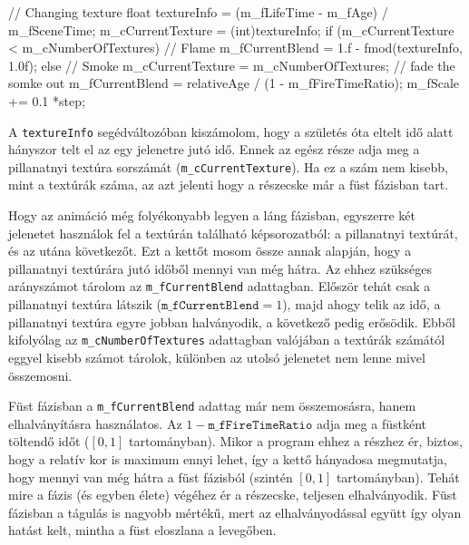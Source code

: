 \begin{cpp}
// Changing texture
float textureInfo = (m_fLifeTime - m_fAge) / m_fSceneTime;
m_cCurrentTexture = (int)textureInfo;
if (m_cCurrentTexture < m_cNumberOfTextures)
{
	// Flame
	m_fCurrentBlend = 1.f - fmod(textureInfo, 1.0f);
}
else
{
	// Smoke
	m_cCurrentTexture = m_cNumberOfTextures;
	// fade the somke out
	m_fCurrentBlend = relativeAge / (1 - m_fFireTimeRatio);
	m_fScale += 0.1 *step;
}
\end{cpp}

A \texttt{textureInfo} segédváltozóban kiszámolom, hogy a születés óta eltelt idő alatt hányszor telt el az egy jelenetre jutó idő. Ennek az egész része adja meg a pillanatnyi textúra sorszámát (\texttt{m\_cCurrentTexture}). Ha ez a szám nem kisebb, mint a textúrák száma, az azt jelenti hogy a részecske már a füst fázisban tart.

Hogy az animáció még folyékonyabb legyen a láng fázisban, egyszerre két jelenetet használok fel a textúrán található képsorozatból: a pillanatnyi textúrát, és az utána következőt. Ezt a kettőt mosom össze annak alapján, hogy a pillanatnyi textúrára jutó időből mennyi van még hátra. Az ehhez szükséges arányszámot tárolom az \texttt{m\_fCurrentBlend} adattagban. Először tehát csak a pillanatnyi textúra látszik ($\texttt{m\_fCurrentBlend} = 1$), majd ahogy telik az idő, a pillanatnyi textúra egyre jobban halványodik, a következő pedig erősödik. Ebből kifolyólag az \texttt{m\_cNumberOfTextures} adattagban valójában a textúrák számától eggyel kisebb számot tárolok, különben az utolsó jelenetet nem lenne mivel összemosni.

Füst fázisban a \texttt{m\_fCurrentBlend} adattag már nem összemosásra, hanem elhalványításra használatos. Az $1 - \texttt{m\_fFireTimeRatio}$ adja meg a füstként töltendő időt ($[0, 1]$ tartományban). Mikor a program ehhez a részhez ér, biztos, hogy a relatív kor is maximum ennyi lehet, így a kettő hányadosa megmutatja, hogy mennyi van még hátra a füst fázisból (szintén $[0, 1]$ tartományban). Tehát mire a fázis (és egyben élete) végéhez ér a részecske, teljesen elhalványodik. Füst fázisban a tágulás is nagyobb mértékű, mert az elhalványodással együtt így olyan hatást kelt, mintha a füst eloszlana a levegőben.

